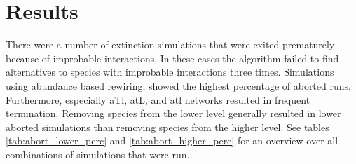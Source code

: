 \documentclass[12pt,a4paper]{article}
\begin{document}
\section{Results}
There were a number of extinction simulations that were exited prematurely because of improbable interactions. In these cases the algorithm failed to find alternatives to species with improbable interactions three times. Simulations using abundance based rewiring, showed the highest percentage of aborted runs. Furthermore, especially aTl, atL, and atl networks resulted in frequent termination. Removing species from the lower level generally resulted in lower aborted simulations than removing species from the higher level. See tables \ref{tab:abort_lower_perc} and \ref{tab:abort_higher_perc} for an overview over all combinations of simulations that were run.
\end{document}
